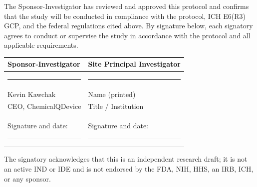 The Sponsor-Investigator has reviewed and approved this protocol and confirms
that the study will be conducted in compliance with the protocol, ICH E6(R3) GCP,
and the federal regulations cited above. By signature below, each signatory
agrees to conduct or supervise the study in accordance with the protocol and all
applicable requirements.

\vspace{0.6em}

\noindent\begin{tabularx}{\textwidth}{L{8.2cm} Y}
\toprule
\textbf{Sponsor-Investigator} & \textbf{Site Principal Investigator} \\
\midrule
\vspace{0.1em}\rule{6.0cm}{0.4pt} & \vspace{0em}\rule{6.0cm}{0.4pt} \\
Kevin Kawchak & Name (printed) \\
CEO, ChemicalQDevice & Title / Institution \\[0.8em]
Signature and date: \rule{2.6cm}{0.4pt} & Signature and date: \rule{2.6cm}{0.4pt} \vspace{0.05cm} \\
\bottomrule
\end{tabularx}

\vspace{0.3em}

\noindent The signatory acknowledges that this is an independent research draft;
it is not an active IND or IDE and is not endorsed by the FDA, NIH, HHS, an IRB,
ICH, or any sponsor.


